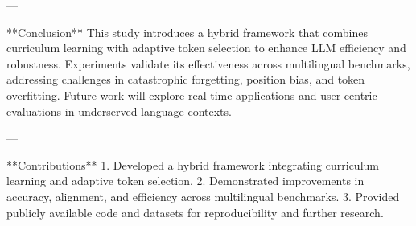 ---

**Conclusion**  
This study introduces a hybrid framework that combines curriculum learning with adaptive token selection to enhance LLM efficiency and robustness. Experiments validate its effectiveness across multilingual benchmarks, addressing challenges in catastrophic forgetting, position bias, and token overfitting. Future work will explore real-time applications and user-centric evaluations in underserved language contexts.

---

**Contributions**  
1. Developed a hybrid framework integrating curriculum learning and adaptive token selection.  
2. Demonstrated improvements in accuracy, alignment, and efficiency across multilingual benchmarks.  
3. Provided publicly available code and datasets for reproducibility and further research.  